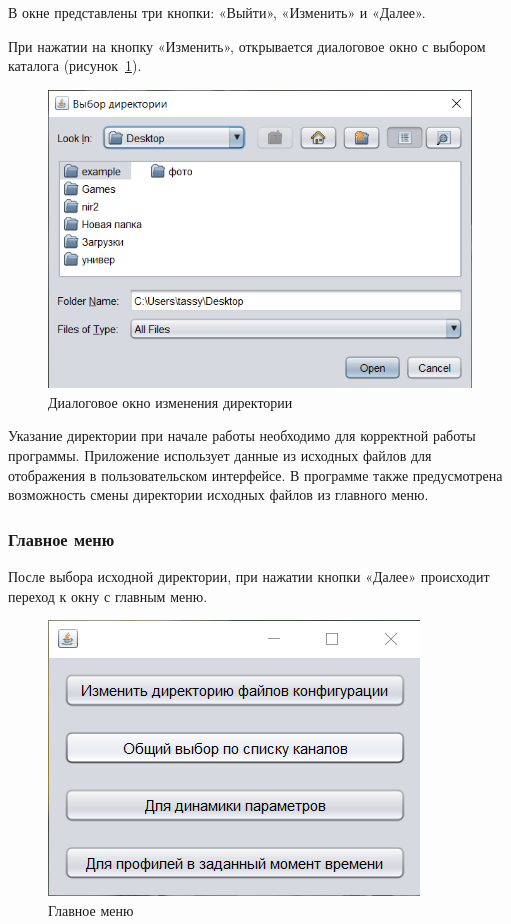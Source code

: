 В окне представлены три кнопки: «Выйти», «Изменить» и «Далее». 

При нажатии на кнопку «Изменить», открывается диалоговое окно с выбором каталога (рисунок~\ref{fig:edit-dir}).
\begin{figure}[H]
	\centering
	\includegraphics[width=0.7\linewidth]{pics/edit-dir}
	\caption{Диалоговое окно изменения директории}
	\label{fig:edit-dir}
\end{figure}

Указание директории при начале работы необходимо для корректной работы программы. Приложение использует данные из исходных файлов для отображения в пользовательском интерфейсе. В программе также предусмотрена возможность смены директории исходных файлов из главного меню.


\subsubsection{Главное меню}

После выбора исходной директории, при нажатии кнопки «Далее» происходит переход к окну с главным меню. 
\begin{figure}[H]
	\centering
	\includegraphics[width=0.7\linewidth]{pics/menu}
	\caption{Главное меню}
	\label{fig:menu}
\end{figure}

